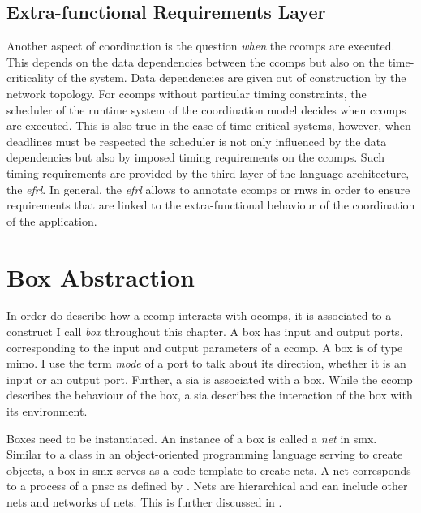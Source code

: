 \subsection{Extra-functional Requirements Layer}
\label{sect_smx_model_efrl}
Another aspect of coordination is the question \emph{when} the \glspl*{ccomp} are executed.
This depends on the data dependencies between the \glspl*{ccomp} but also on the time-criticality of the system.
Data dependencies are given out of construction by the network topology.
For \glspl*{ccomp} without particular timing constraints, the scheduler of the runtime system of the coordination model decides when \glspl*{ccomp} are executed.
This is also true in the case of time-critical systems, however, when deadlines must be respected the scheduler is not only influenced by the data dependencies but also by imposed timing requirements on the \glspl*{ccomp}.
Such timing requirements are provided by the third layer of the language architecture, the \emph{\gls*{efrl}}.
In general, the \emph{\gls*{efrl}} allows to annotate \glspl*{ccomp} or \glspl*{rnw} in order to ensure requirements that are linked to the extra-functional behaviour of the coordination of the application.

\section{Box Abstraction}
\label{sect_smx_box}
In order do describe how a \gls*{ccomp} interacts with \glspl*{ocomp}, it is associated to a construct I call \emph{box} throughout this chapter.
A box has input and output ports, corresponding to the input and output parameters of a \gls*{ccomp}.
A box is of type \gls{mimo}.
I use the term \emph{mode} of a port to talk about its direction, \ie whether it is an input or an output port.
Further, a \gls{sia} is associated with a box.
While the \gls*{ccomp} describes the behaviour of the box, a \gls{sia} describes the interaction of the box with its environment.

Boxes need to be instantiated.
An instance of a box is called a \emph{net} in \gls*{smx}.
Similar to a class in an object-oriented programming language serving to create objects, a box in \gls*{smx} serves as a code template to create nets.
A net corresponds to a process of a \gls{pnsc} as defined by \Def{\ref{def_proc}}.
Nets are hierarchical and can include other nets and networks of nets.
This is further discussed in \Sect{\ref{sect_smx_nets}}.

